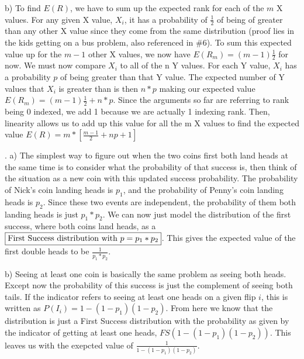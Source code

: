 \documentclass[11pt]{article}
\begin{document}
\smallskip
    b) To find $E(R)$, we have to sum up the expected rank for each of the $m$ X values.  For any given X value, $X_i$, it has a probability of $\frac{1}{2}$ of being of greater than any other X value since they come from the same distribution (proof lies in the kids getting on a bus problem, also referenced in \#6). To sum this expected value up for the $m-1$ other X values, we now have $E(R_m) = (m-1)\frac{1}{2}$ for now.  We must now compare $X_i$ to all of the n Y values.  For each Y value, $X_i$ has a probability $p$ of being greater than that Y value.  The expected number of Y values that $X_i$ is greater than is then $n*p$ making our expected value $E(R_m) = (m-1)\frac{1}{2} + n*p$.  Since the arguments so far are referring to rank being 0 indexed, we add 1 because we are actually 1 indexing rank.  Then, linearity allows us to add up this value for all the m X values to find the expected value $\boxed{E(R) = m*[\frac{m-1}{2} + np+1]}$

\bigskip

. 
\smallskip
    a) The simplest way to figure out when the two coins first both land heads at the same time is to consider what the probability of that success is, then think of the situation as a new coin with this updated success probability.  The probability of Nick's coin landing heads is $p_1$, and the probability of Penny's coin landing heads is $p_2$.  Since these two events are independent, the probability of them both landing heads is just $p_1*p_2$.  We can now just model the distribution of the first success, where both coins land heads, as a $\boxed{$First Success distribution with $p=p_1*p_2}$.  This gives the expected value of the first double heads to be $\boxed{\frac{1}{p_1*p_2}}$.\\
\smallskip

    b) Seeing at least one coin is basically the same problem as seeing both heads.  Except now the probability of this success is just the complement of seeing both tails.  If the indicator refers to seeing at least one heads on a given flip $i$, this is written as $P(I_i) = 1-(1-p_1)(1-p_2)$.  From here we know that the distribution is just a First Success distribution with the probability as given by the indicator of getting at least one heads, $\boxed{FS(1-(1-p_1)(1-p_2))}$.  This leaves us with the exepcted value of $\boxed{\frac{1}{1-(1-p_1)(1-p_2)}}$.\\

\smallskip
\end{document}
